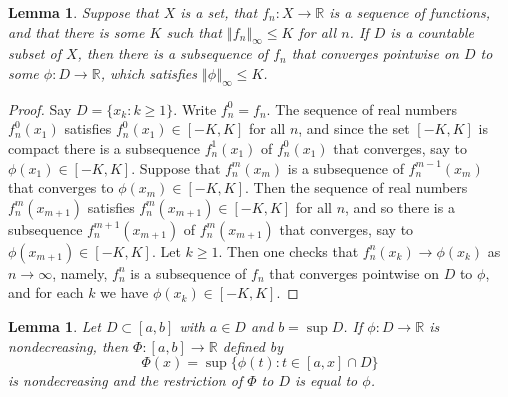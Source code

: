 \documentclass{article}
\newcommand{\norm}[1]{\left\Vert #1 \right\Vert}
\newtheorem{lemma}[theorem]{Lemma}
\theoremstyle{definition}
\begin{document}
\begin{lemma}
Suppose that $X$ is a set, that $f_n:X \to \mathbb{R}$ is a sequence of functions, and that there is some
$K$ such that $\norm{f_n}_\infty \leq K$ for all $n$. If $D$ is a countable subset of $X$, then there is a subsequence of $f_n$
that converges pointwise on $D$ to some $\phi:D \to \mathbb{R}$, which satisfies $\norm{\phi}_\infty \leq K$.
\label{diagonal}
\end{lemma}
\begin{proof}
Say $D=\{x_k: k \geq 1\}$. Write 
$f_n^0=f_n$.
The sequence of real numbers $f_n^0(x_1)$ satisfies $f_n^0(x_1) \in [-K,K]$ for all $n$, and since
the set $[-K,K]$ is compact there is a  subsequence $f^1_n(x_1)$ of $f_n^0(x_1)$ that converges, say to
$\phi(x_1) \in [-K,K]$. Suppose that $f_n^m(x_m)$ is a subsequence of $f_n^{m-1}(x_m)$ that converges to $\phi(x_m) \in [-K,K]$.
Then the sequence of real numbers $f_n^m(x_{m+1})$ satisfies $f_n^m(x_{m+1}) \in [-K,K]$ for all $n$, and so
there is a subsequence $f_n^{m+1}(x_{m+1})$ of $f_n^m(x_{m+1})$ that converges, say to $\phi(x_{m+1}) \in [-K,K]$.
Let $k \geq 1$. Then one checks that $f_n^n(x_k) \to \phi(x_k)$ as $n \to \infty$, namely, $f_n^n$ is a subsequence of $f_n$
that converges pointwise on $D$ to $\phi$, and for each $k$ we have $\phi(x_k) \in [-K,K]$.
\end{proof}


\begin{lemma}
Let $D \subset [a,b]$ with $a \in D$ and $b=\sup D$. If $\phi:D \to \mathbb{R}$ is nondecreasing, then $\Phi:[a,b] \to \mathbb{R}$ defined by
\[
\Phi(x)=\sup\{\phi(t): t \in [a,x] \cap D\}
\]
is nondecreasing and the restriction of $\Phi$ to $D$ is equal to $\phi$.
\label{extension}
\end{lemma}
\end{document}
